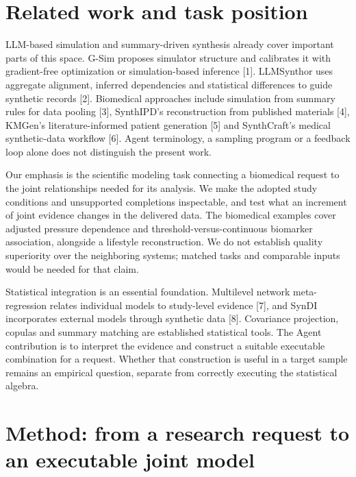 \documentclass[11pt,letterpaper]{article}
\begin{document}

\section{Related work and task position}

LLM-based simulation and summary-driven synthesis already cover important parts of this space. G-Sim proposes simulator structure and calibrates it with gradient-free optimization or simulation-based inference [1]. LLMSynthor uses aggregate alignment, inferred dependencies and statistical differences to guide synthetic records [2]. Biomedical approaches include simulation from summary rules for data pooling [3], SynthIPD's reconstruction from published materials [4], KMGen's literature-informed patient generation [5] and SynthCraft's medical synthetic-data workflow [6]. Agent terminology, a sampling program or a feedback loop alone does not distinguish the present work.


Our emphasis is the scientific modeling task connecting a biomedical request to the joint relationships needed for its analysis. We make the adopted study conditions and unsupported completions inspectable, and test what an increment of joint evidence changes in the delivered data. The biomedical examples cover adjusted pressure dependence and threshold-versus-continuous biomarker association, alongside a lifestyle reconstruction. We do not establish quality superiority over the neighboring systems; matched tasks and comparable inputs would be needed for that claim.


Statistical integration is an essential foundation. Multilevel network meta-regression relates individual models to study-level evidence [7], and SynDI incorporates external models through synthetic data [8]. Covariance projection, copulas and summary matching are established statistical tools. The Agent contribution is to interpret the evidence and construct a suitable executable combination for a request. Whether that construction is useful in a target sample remains an empirical question, separate from correctly executing the statistical algebra.



\section{Method: from a research request to an executable joint model}

\FloatBarrier
\end{document}
